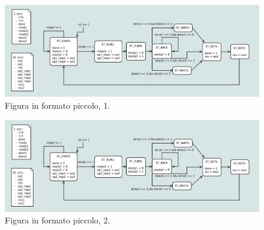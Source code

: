 \documentclass[]{IEEEtran}
\begin{document}
\begin{figure}[bt]
	\centering
	\includegraphics[width=\columnwidth]{figures/EFSM-top_level}
	\caption{Figura in formato piccolo, 1.}
	\label{fig:piccola1}
\end{figure}

\begin{figure}[bt]
	\centering
	\includegraphics[width=\columnwidth]{figures/EFSM-top_level}
	\caption{Figura in formato piccolo, 2.}
	\label{fig:piccola2}
\end{figure}
\end{document}
